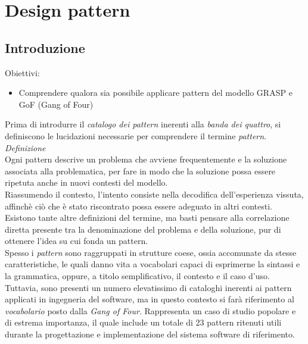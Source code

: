 \documentclass{article}
\begin{document}
\pagestyle{empty}
\section*{Design pattern}
\large

\subsection*{Introduzione}
\large
Obiettivi:
\begin{itemize}
    \renewcommand{\labelitemi}{-}
    \itemsep0em
    \item Comprendere qualora sia possibile applicare pattern del modello GRASP e GoF (Gang of Four) 
\end{itemize}
Prima di introdurre il \textit{catalogo dei pattern} inerenti alla \textit{banda dei quattro}, si definiscono le lucidazioni necessarie per comprendere il termine \textit{pattern}.\vspace*{14pt}\\
\textit{Definizione}\\
Ogni pattern descrive un problema che avviene frequentemente e la soluzione associata alla problematica, per fare in modo che la soluzione possa essere ripetuta anche in nuovi contesti del modello.\vspace*{14pt}\\
Riassumendo il contesto, l'intento consiste nella decodifica dell'esperienza vissuta, affinchè ciò che è stato riscontrato possa essere adeguato in altri contesti. Esistono tante altre definizioni del termine, ma basti pensare alla correlazione diretta presente tra la denominazione del problema e della soluzione, pur di ottenere l'idea su cui fonda un pattern.\vspace*{14pt}\\
Spesso i \textit{pattern} sono raggruppati in strutture coese, ossia accomunate da stesse caratteristiche, le quali danno vita a vocabolari capaci di esprimerne la sintassi e la grammatica, oppure, a titolo semplificativo, il contesto e il caso d'uso. Tuttavia, sono presenti un numero elevatissimo di cataloghi inerenti ai pattern applicati in ingegneria del software, ma in questo contesto si farà riferimento al \textit{vocabolario} posto dalla \textit{Gang of Four}. Rappresenta un caso di studio popolare e di estrema importanza, il quale include un totale di 23 pattern ritenuti utili durante la progettazione e implementazione del sistema software di riferimento.
\end{document}
